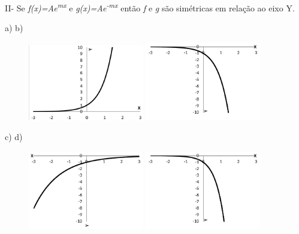 \begin{respostas}{3}
II- Se \textit{f(x)=Ae\textsuperscript{mx}} e \textit{g(x)=Ae\textsuperscript{-mx}} então \textit{f} e \textit{g} são simétricas em relação ao eixo Y.

\ansitem{} a) \tab b)

\begin{figure}[H]
    \includegraphics[width=0.45\textwidth]{capitulos/potencias_e_funcoes_exponenciais/media/image25.png} 
    \includegraphics[width=0.45\textwidth]{capitulos/potencias_e_funcoes_exponenciais/media/image26.pdf}
\end{figure}

c) \tab d)

\begin{figure}[H]
    \includegraphics[width=0.45\textwidth]{capitulos/potencias_e_funcoes_exponenciais/media/image27.pdf} 
    \includegraphics[width=0.45\textwidth]{capitulos/potencias_e_funcoes_exponenciais/media/image28.pdf}
\end{figure}


\end{respostas}
